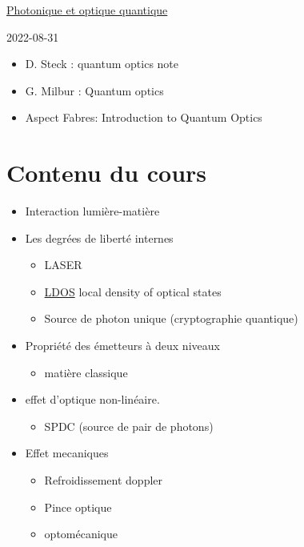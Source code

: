 


\underline{{ \Huge Photonique et optique quantique}} 


2022-08-31

\begin{tcolorbox}[title=Références]
\begin{itemize}
	\item D. Steck : quantum optics note
	\item G. Milbur : Quantum optics
	\item Aspect Fabres: Introduction to Quantum Optics
\end{itemize}
	 
\end{tcolorbox}

\section*{Contenu du cours}

\begin{itemize}
	\item Interaction lumière-matière
	\item Les degrées de liberté internes
		\begin{itemize}
			\item LASER
			\item \underline{LDOS} local density of optical states
			\item Source de photon unique (cryptographie quantique)
		\end{itemize}
	\item Propriété des émetteurs à deux niveaux
		\begin{itemize}
			\item matière classique
		\end{itemize}
	\item effet d'optique non-linéaire.
		\begin{itemize}
			\item SPDC (source de pair de photons)
		\end{itemize}
	\item Effet mecaniques
		\begin{itemize}
			\item Refroidissement doppler	
			\item Pince optique
			\item optomécanique
		\end{itemize}
\end{itemize}

